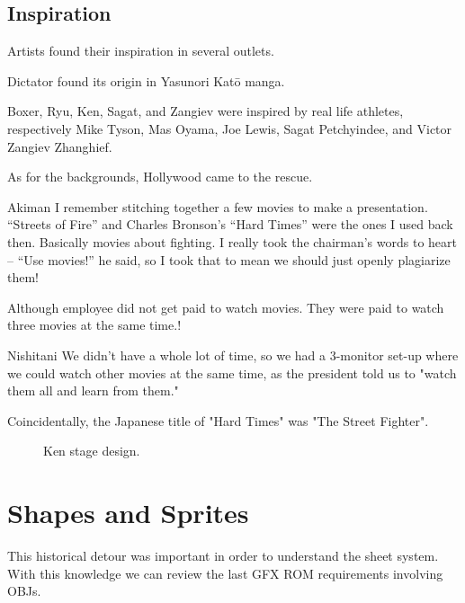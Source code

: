 \subsection{Inspiration}
Artists found their inspiration in several outlets.

Dictator found its origin in Yasunori Katō manga. 

Boxer, Ryu, Ken, Sagat, and Zangiev were inspired by real life athletes, respectively Mike Tyson, Mas Oyama, Joe Lewis, Sagat Petchyindee, and Victor Zangiev Zhanghief. 


As for the backgrounds, Hollywood came to the rescue.

\begin{q}{Akiman\cite{ffdevinterview}}
I remember stitching together a few movies to make a presentation. “Streets of Fire” and Charles Bronson’s “Hard Times” were the ones I used back then. Basically movies about fighting. I really took the chairman’s words to heart – “Use movies!” he said, so I took that to mean we should just openly plagiarize them!
\end{q}

Although employee did not get paid to watch movies. They were paid to watch three movies at the same time.!

\begin{q}{Nishitani\cite{ffdevinterview}}
We didn't have a whole lot of time, so we had a 3-monitor set-up where we could watch other movies at the same time, as the president told us to "watch them all and learn from them."
\end{q}

\begin{trivia}
Coincidentally, the Japanese title of "Hard Times" was "The Street Fighter".
\end{trivia}

 \begin{figure}[H]
\caption*{Ken stage design\cite{sf2completefiles}.}
\end{figure}

\section{Shapes and Sprites}
This historical detour was important in order to understand the sheet system. With this knowledge we can review the last GFX ROM requirements involving OBJs.  

